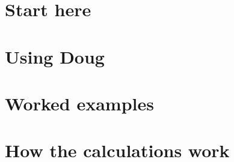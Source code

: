 \documentclass[11pt,oneside,openany]{book}
\begin{document}
\frontmatter

\tableofcontents
\listoffigures
\mainmatter
\part{Start here}



\part{Using Doug}










\part{Worked examples}

\part{How the calculations work}




\appendix




\backmatter
\printindex
\end{document}
